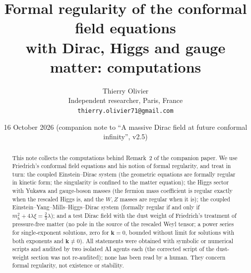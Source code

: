\documentclass[11pt,a4paper]{article}
\title{\textbf{Formal regularity of the conformal field equations\\ with Dirac, Higgs and gauge matter: computations}}
\author{Thierry Olivier\\ \small Independent researcher, Paris, France\\ \small \texttt{thierry.olivier71@gmail.com}}
\date{16 October 2026 \quad (companion note to ``A massive Dirac field at future conformal infinity'', v2.5)}
\begin{document}
\maketitle

\begin{abstract}
This note collects the computations behind Remark~2 of the companion paper. We use Friedrich's conformal field equations \cite{Friedrich2015} and his notion of formal regularity, and treat in turn: the coupled Einstein--Dirac system (the geometric equations are formally regular in kinetic form; the singularity is confined to the matter equation); the Higgs sector with Yukawa and gauge-boson masses (the fermion mass coefficient is regular exactly when the rescaled Higgs is, and the $W,Z$ masses are regular when it is); the coupled Einstein--Yang--Mills--Higgs--Dirac system (formally regular if and only if $m_{h}^{2}+4\lambda\xi=\tfrac23\lambda$); and a test Dirac field with the dust weight of Friedrich's treatment of pressure-free matter \cite{Friedrich2017} (no pole in the source of the rescaled Weyl tensor; a power series for single-exponent solutions, zero for $\mathbf{k}=0$, bounded without limit for solutions with both exponents and $\mathbf{k}\neq0$). All statements were obtained with symbolic or numerical scripts and audited by two isolated AI agents each (the corrected script of the dust-weight section was not re-audited); none has been read by a human. They concern formal regularity, not existence or stability.
\end{abstract}
\end{document}
